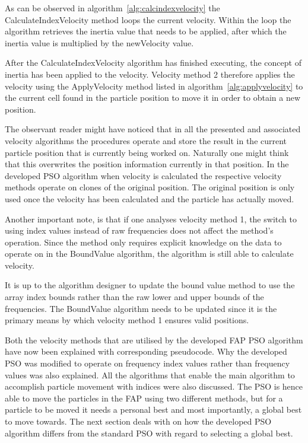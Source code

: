 As can be observed in algorithm~\ref{alg:calcindexvelocity} the CalculateIndexVelocity method loops the current velocity. Within the loop the algorithm retrieves the inertia value that needs to be applied, after which the inertia value is multiplied by the newVelocity value.

After the CalculateIndexVelocity algorithm has finished executing, the concept of inertia has been applied to the velocity. Velocity method 2 therefore applies the velocity using the ApplyVelocity method listed in algorithm~\ref{alg:applyvelocity} to the current cell found in the particle position to move it in order to obtain a new position.

The observant reader might have noticed that in all the presented and associated velocity algorithms the procedures operate and store the result in the current particle position that is currently being worked on. Naturally one might think that this overwrites the position information currently in that position. In the developed \gls{PSO} algorithm when velocity is calculated the respective velocity methods operate on clones of the original position. The original position is only used once the velocity has been calculated and the particle has actually moved.

Another important note, is that if one analyses velocity method 1, the switch to using index values instead of raw frequencies does not affect the method's operation. Since the method only requires explicit knowledge on the data to operate on in the BoundValue algorithm, the algorithm is still able to calculate velocity. 

It is up to the algorithm designer to update the bound value method to use the array index bounds rather than the raw lower and upper bounds of the frequencies. The BoundValue algorithm needs to be updated since it is the primary means by which velocity method 1 ensures valid positions.

Both the velocity methods that are utilised by the developed \gls{FAP} \gls{PSO} algorithm have now been explained with corresponding pseudocode. Why the developed \gls{PSO} was modified to operate on frequency index values rather than frequency values was also explained. All the algorithms that enable the main algorithm to accomplish particle movement with indices were also discussed. The \gls{PSO} is hence able to move the particles in the \gls{FAP} using two different methods, but for a particle to be moved it needs a personal best and most importantly, a global best to move towards. The next section deals with on how the developed \gls{PSO} algorithm differs from the standard \gls{PSO} with regard to selecting a global best.
